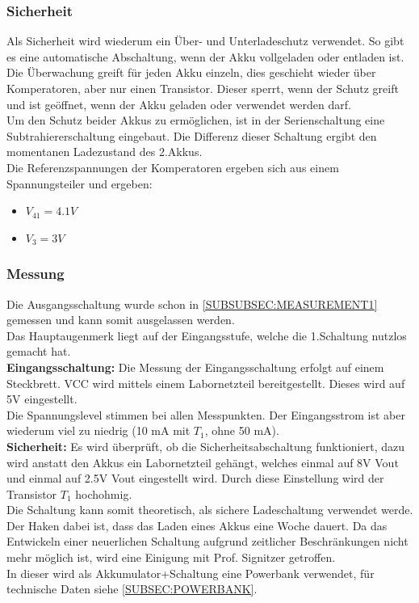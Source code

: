 \documentclass[12pt,a4paper]{article}
\begin{document}
{\subsubsection{Sicherheit}
\label{SUBSUBSEC:Security}

Als Sicherheit wird wiederum ein Über- und Unterladeschutz verwendet. So gibt es eine automatische Abschaltung, wenn der Akku vollgeladen oder entladen ist. Die Überwachung greift für jeden Akku einzeln, dies geschieht wieder über Komperatoren, aber nur einen Transistor. Dieser sperrt, wenn der Schutz greift und ist geöffnet, wenn der Akku geladen oder verwendet werden darf. \\
Um den Schutz beider Akkus zu ermöglichen, ist in der Serienschaltung eine Subtrahiererschaltung eingebaut. Die Differenz dieser Schaltung ergibt den momentanen Ladezustand des 2.Akkus.\\
Die Referenzspannungen der Komperatoren ergeben sich aus einem Spannungsteiler und ergeben:
\begin{itemize}
	\item{$V_{41} = 4.1V$}
	\item{$V_3 = 3V$}
\end{itemize}
\subsubsection{Messung}
\label{SUBSUBSEC:MEASUREMENT2}

Die Ausgangsschaltung wurde schon in \ref{SUBSUBSEC:MEASUREMENT1} gemessen und kann somit ausgelassen werden.  \\
Das Hauptaugenmerk liegt auf der Eingangsstufe, welche die 1.Schaltung nutzlos gemacht hat. \\

\textbf{Eingangsschaltung: }Die Messung der Eingangsschaltung erfolgt auf einem Steckbrett. VCC wird mittels einem Labornetzteil bereitgestellt. Dieses wird auf 5V eingestellt. \\
Die Spannungslevel stimmen bei allen Messpunkten. Der Eingangsstrom ist aber wiederum viel zu niedrig (10 mA mit $T_1$, ohne 50 mA). \\
\textbf{Sicherheit:} Es wird überprüft, ob die Sicherheitsabschaltung funktioniert, dazu wird anstatt den Akkus ein Labornetzteil gehängt, welches einmal auf 8V Vout und einmal auf 2.5V Vout eingestellt wird. Durch diese Einstellung wird der Transistor $T_1$ hochohmig. \\
Die Schaltung kann somit theoretisch, als sichere Ladeschaltung verwendet werde. Der Haken dabei ist, dass das Laden eines Akkus eine Woche dauert. Da das Entwickeln einer neuerlichen Schaltung aufgrund zeitlicher Beschränkungen nicht mehr möglich ist, wird eine Einigung mit Prof. Signitzer getroffen. \\
In dieser wird als Akkumulator+Schaltung eine Powerbank verwendet, für technische Daten siehe \ref{SUBSEC:POWERBANK}.

}
\end{document}
